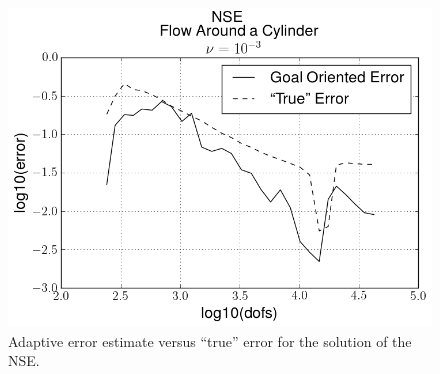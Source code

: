     \begin{figure}[h!]
        \centering
        \includegraphics[scale=0.5]{Figures/AdaptiveCylinder.png}
        \caption{Adaptive error estimate versus ``true'' error for the solution
            of the NSE.}
        \label{fig:NSE_err}
    \end{figure}

